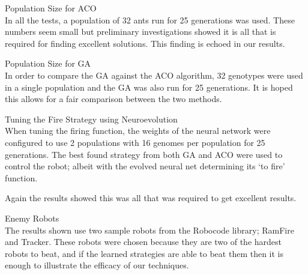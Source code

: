 \begin{description}
\item Population Size for ACO \hfill \\
In all the tests, a population of 32 ants run for 25 generations was used. These numbers seem small but preliminary investigations showed it is all that is required for finding excellent solutions. This finding is echoed in our results.

\item Population Size for GA \hfill \\
In order to compare the GA against the ACO algorithm, 32 genotypes were used in a single population and the GA was also run for 25 generations. It is hoped this allows for a fair comparison between the two methods.

\item Tuning the Fire Strategy using Neuroevolution \hfill \\
When tuning the firing function, the weights of the neural network were configured to use 2 populations with 16 genomes per population for 25 generations. The best found strategy from both GA and ACO were used to control the robot; albeit with the evolved neural net determining its `to fire' function.

Again the results showed this was all that was required to get excellent results.

\item Enemy Robots \hfill \\
The results shown use two sample robots from the Robocode library; RamFire and Tracker. These robots were chosen because they are two of the hardest robots to beat, and if the learned strategies are able to beat them then it is enough to illustrate the efficacy of our techniques.

\end{description}


